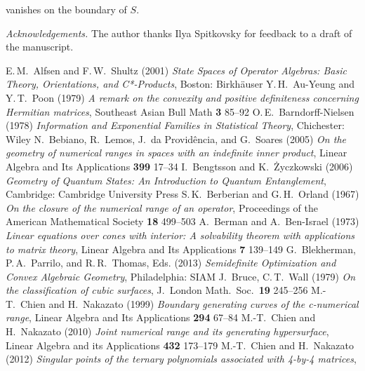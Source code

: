 \documentclass[12pt]{amsart}
\theoremstyle{definition}
\numberwithin{equation}{section}
\begin{document}
vanishes on the boundary of $S$. 
\vspace{2\baselineskip}
\par\normalsize
{\par\noindent\footnotesize
{\em Acknowledgements.} 
The author thanks Ilya Spitkovsky for feedback to a draft
of the manuscript.}

\begin{thebibliography}{10}
 E.\,M.~Alfsen and F.\,W.~Shultz (2001)
{\em State Spaces of Operator Algebras: 
Basic Theory, Orientations, and C*-Products}, 
Boston: Birkh{\"a}user
 Y.\,H.~Au-Yeung and Y.\,T.~Poon (1979)
{\em A remark on the convexity and positive definiteness
concerning Hermitian matrices},
Southeast Asian Bull Math {\bf 3} 85--92
 O.\,E.~Barndorff-Nielsen (1978)
{\em Information and Exponential Families in Statistical Theory},
Chichester: Wiley
 N.~Bebiano, R.~Lemos, J.~da Providência, 
and G.~Soares (2005)
{\em On the geometry of numerical ranges in spaces with an indefinite 
inner product},
Linear Algebra and Its Applications {\bf 399} 17--34
 I.~Bengtsson and K.~{\.Z}yczkowski (2006) 
{\em Geometry of Quantum States: An Introduction to Quantum Entanglement},
Cambridge: Cambridge University Press
 S.\,K.~Berberian and G.\,H.~Orland (1967)
{\em On the closure of the numerical range of an operator}, 
Proceedings of the American Mathematical Society {\bf 18} 499--503
 A.~Berman and A.~Ben-Israel (1973)
{\em Linear equations over cones with interior: 
A solvability theorem with applications to matrix theory},
Linear Algebra and Its Applications {\bf 7} 139--149
 G.~Blekherman, P.\,A.~Parrilo, and 
R.\,R.~Thomas, Eds. (2013)
{\em Semidefinite Optimization and Convex Algebraic Geometry},
Philadelphia: SIAM 
 J.~Bruce, C.\,T.~Wall (1979)
{\em On the classification of cubic surfaces}, 
J.\ London Math.\ Soc.\ {\bf 19} 245--256
 M.-T.~Chien and H.~Nakazato (1999)
{\em Boundary generating curves of the c-numerical range},
Linear Algebra and Its Applications {\bf 294} 67--84
 M.-T.~Chien and H.~Nakazato (2010) 
{\em Joint numerical range and its generating hypersurface}, 
Linear Algebra and its Applications {\bf 432} 173--179
 M.-T.~Chien and H.~Nakazato (2012) 
{\em Singular points of the ternary polynomials associated with 4-by-4 matrices},

\end{thebibliography}
\end{document}
